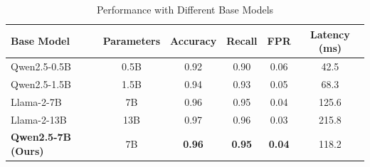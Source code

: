 
\begin{table}[h]
\centering
\caption{Performance with Different Base Models}
\label{tab:base_models}
\begin{tabular}{lccccc}
\toprule
\textbf{Base Model} & \textbf{Parameters} & \textbf{Accuracy} & \textbf{Recall} & \textbf{FPR} & \textbf{Latency (ms)} \\
\midrule
Qwen2.5-0.5B & 0.5B & 0.92 & 0.90 & 0.06 & 42.5 \\
Qwen2.5-1.5B & 1.5B & 0.94 & 0.93 & 0.05 & 68.3 \\
Llama-2-7B & 7B & 0.96 & 0.95 & 0.04 & 125.6 \\
Llama-2-13B & 13B & 0.97 & 0.96 & 0.03 & 215.8 \\
\midrule
\textbf{Qwen2.5-7B (Ours)} & 7B & \textbf{0.96} & \textbf{0.95} & \textbf{0.04} & 118.2 \\
\bottomrule
\end{tabular}
\end{table}
